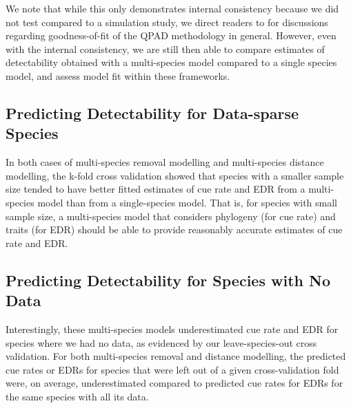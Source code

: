 \documentclass[12pt]{article}
\begin{document}
\par We note that while this only demonstrates internal consistency because we did not test compared to a simulation study, we direct readers to \citet{solymos_calibrating_2013, solymos_evaluating_2018, solymos_lessons_2020} for discussions regarding goodness-of-fit of the QPAD methodology in general.
However, even with the internal consistency, we are still then able to compare estimates of detectability obtained with a multi-species model compared to a single species model, and assess model fit within these frameworks.

\subsection{Predicting Detectability for Data-sparse Species}

\par In both cases of multi-species removal modelling and multi-species distance modelling, the k-fold cross validation showed that species with a smaller sample size tended to have better fitted estimates of cue rate and EDR from a multi-species model than from a single-species model.
That is, for species with small sample size, a multi-species model that considers phylogeny (for cue rate) and traits (for EDR) should be able to provide reasonably accurate estimates of cue rate and EDR.

\subsection{Predicting Detectability for Species with No Data}\label{discussion-nodata}

\par Interestingly, these multi-species models underestimated cue rate and EDR for species where we had no data, as evidenced by our leave-species-out cross validation.
For both multi-species removal and distance modelling, the predicted cue rates or EDRs for species that were left out of a given cross-validation fold were, on average, underestimated compared to predicted cue rates for EDRs for the same species with all its data.
\end{document}
